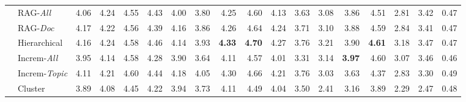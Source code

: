 \begin{table*}[]
\begin{tabular}{@{}clrrrrrrrrrrrrrrrc@{}}
 & \multicolumn{1}{l|}{RAG-\textit{All}} & \cellcolor[HTML]{DAE8FC}4.06 & \cellcolor[HTML]{DAE8FC}4.24 & \cellcolor[HTML]{DAE8FC}4.55 & \cellcolor[HTML]{DAE8FC}4.43 & \multicolumn{1}{r|}{4.00} & 3.80 & \cellcolor[HTML]{DAE8FC}4.25 & 4.60 & 4.13 & \multicolumn{1}{r|}{3.63} & \cellcolor[HTML]{DAE8FC}3.08 & \cellcolor[HTML]{DAE8FC}3.86 & \cellcolor[HTML]{DAE8FC}4.51 & 2.81 & \multicolumn{1}{r|}{3.42} & 0.47 \\
 & \multicolumn{1}{l|}{RAG-\textit{Doc}} & \cellcolor[HTML]{DAE8FC}4.17 & \cellcolor[HTML]{DAE8FC}4.22 & \cellcolor[HTML]{DAE8FC}4.56 & \cellcolor[HTML]{DAE8FC}4.39 & \multicolumn{1}{r|}{\cellcolor[HTML]{DAE8FC}4.16} & 3.86 & \cellcolor[HTML]{DAE8FC}4.26 & \cellcolor[HTML]{DAE8FC}4.64 & 4.24 & \multicolumn{1}{r|}{3.71} & \cellcolor[HTML]{DAE8FC}3.10 & \cellcolor[HTML]{DAE8FC}3.88 & \cellcolor[HTML]{DAE8FC}4.59 & 2.84 & \multicolumn{1}{r|}{3.41} & 0.47 \\
 & \multicolumn{1}{l|}{Hierarchical} & \cellcolor[HTML]{DAE8FC}4.16 & \cellcolor[HTML]{DAE8FC}4.24 & \cellcolor[HTML]{DAE8FC}4.58 & \cellcolor[HTML]{DAE8FC}4.46 & \multicolumn{1}{r|}{\cellcolor[HTML]{DAE8FC}4.14} & 3.93 & \cellcolor[HTML]{DAE8FC}\textbf{4.33} & \cellcolor[HTML]{DAE8FC}\textbf{4.70} & 4.27 & \multicolumn{1}{r|}{3.76} & \cellcolor[HTML]{DAE8FC}3.21 & \cellcolor[HTML]{DAE8FC}3.90 & \cellcolor[HTML]{DAE8FC}\textbf{4.61} & \cellcolor[HTML]{DAE8FC}3.18 & \multicolumn{1}{r|}{\cellcolor[HTML]{DAE8FC}3.47} & 0.47 \\
 & \multicolumn{1}{l|}{Increm-\textit{All}} & 3.95 & \cellcolor[HTML]{DAE8FC}4.14 & \cellcolor[HTML]{DAE8FC}4.58 & 4.28 & \multicolumn{1}{r|}{3.90} & 3.64 & 4.11 & 4.57 & 4.01 & \multicolumn{1}{r|}{3.31} & \cellcolor[HTML]{DAE8FC}3.14 & \cellcolor[HTML]{DAE8FC}\textbf{3.97} & \cellcolor[HTML]{DAE8FC}4.60 & \cellcolor[HTML]{DAE8FC}3.07 & \multicolumn{1}{r|}{3.46} & 0.46 \\
 & \multicolumn{1}{l|}{Increm-\textit{Topic}} & \cellcolor[HTML]{DAE8FC}4.11 & \cellcolor[HTML]{DAE8FC}4.21 & \cellcolor[HTML]{DAE8FC}4.60 & \cellcolor[HTML]{DAE8FC}4.44 & \multicolumn{1}{r|}{\cellcolor[HTML]{DAE8FC}4.18} & \cellcolor[HTML]{DAE8FC}4.05 & \cellcolor[HTML]{DAE8FC}4.30 & \cellcolor[HTML]{DAE8FC}4.66 & 4.21 & \multicolumn{1}{r|}{3.76} & \cellcolor[HTML]{DAE8FC}3.03 & 3.63 & 4.37 & 2.83 & \multicolumn{1}{r|}{3.30} & 0.49 \\
 & \multicolumn{1}{l|}{Cluster} & 3.89 & 4.08 & 4.45 & 4.22 & \multicolumn{1}{r|}{3.94} & 3.73 & 4.11 & 4.49 & 4.04 & \multicolumn{1}{r|}{3.50} & 2.41 & 3.16 & 3.89 & 2.29 & \multicolumn{1}{r|}{2.47} & 0.48 \\

\end{tabular}
\end{table*}
